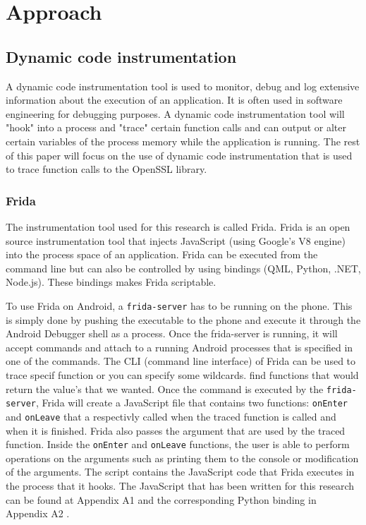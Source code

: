 \documentclass[12pt, a4paper]{report}
\begin{document}
\chapter{Approach}
\section{Dynamic code instrumentation}

A dynamic code instrumentation tool is used to monitor, debug and log extensive information about the execution of an application. It is often used in software engineering for debugging purposes. A dynamic code instrumentation tool will "hook" into a process and "trace" certain function calls and can output or alter certain variables of the process memory while the application is running.
\newline
\newline
The rest of this paper will focus on the use of dynamic code instrumentation that is used to trace function calls to the OpenSSL library. 

\subsection{Frida}

The instrumentation tool used for this research is called Frida. Frida is an open source instrumentation tool that injects JavaScript (using Google's V8 engine) into the process space of an application. Frida can be executed from the command line but can also be controlled by using bindings (QML, Python, .NET, Node.js). These bindings makes Frida scriptable. 

To use Frida on Android, a \texttt{frida-server} has to be running on the phone. This is simply done by pushing the executable to the phone and execute it through the Android Debugger shell as a process. Once the frida-server is running, it will accept commands and attach to a running Android processes that is specified in one of the commands.
\newline
\newline
The CLI (command line interface) of Frida can be used to trace specif function or you can specify some wildcards. find functions that would return the value's that we wanted. Once the command is executed by the \texttt{frida-server}, Frida will create a JavaScript file that contains two functions: \texttt{onEnter} and \texttt{onLeave} that a respectivly called when the traced function is called and when it is finished. Frida also passes the argument that are used by the traced function. Inside the \texttt{onEnter} and \texttt{onLeave} functions, the user is able to perform operations on the arguments such as printing them to the console or modification of the arguments. 
 The script contains the JavaScript code that Frida executes in the process that it hooks. The JavaScript that has been written for this research can be found at Appendix A1 and the corresponding Python binding in Appendix A2 .
\clearpage
\end{document}
